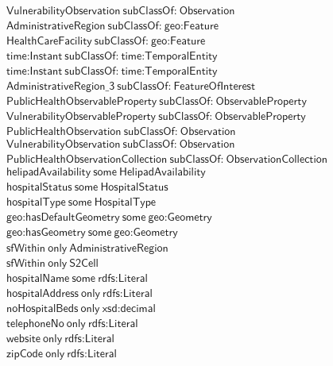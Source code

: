 \begin{align}
  \textsf{VulnerabilityObservation}~\textsf{subClassOf:}~\textsf{Observation}\\
  \textsf{AdministrativeRegion}~\textsf{subClassOf:}~\textsf{geo:Feature}\\
  \textsf{HealthCareFacility}~\textsf{subClassOf:}~\textsf{geo:Feature}\\
  \textsf{time:Instant}~\textsf{subClassOf:}~\textsf{time:TemporalEntity}\\
  \textsf{time:Instant}~\textsf{subClassOf:}~\textsf{time:TemporalEntity}\\
  \textsf{AdministrativeRegion\_3}~\textsf{subClassOf:}~\textsf{FeatureOfInterest}\\
  \textsf{PublicHealthObservableProperty}~\textsf{subClassOf:}~\textsf{ObservableProperty}\\
  \textsf{VulnerabilityObservableProperty}~\textsf{subClassOf:}~\textsf{ObservableProperty}\\
  \textsf{PublicHealthObservation}~\textsf{subClassOf:}~\textsf{Observation}\\
  \textsf{VulnerabilityObservation}~\textsf{subClassOf:}~\textsf{Observation}\\
  \textsf{PublicHealthObservationCollection}~\textsf{subClassOf:}~\textsf{ObservationCollection}\\
  \textsf{helipadAvailability}~\textsf{some}~\textsf{HelipadAvailability}\\
  \textsf{hospitalStatus}~\textsf{some}~\textsf{HospitalStatus}\\
  \textsf{hospitalType}~\textsf{some}~\textsf{HospitalType}\\
  \textsf{geo:hasDefaultGeometry}~\textsf{some}~\textsf{geo:Geometry}\\
  \textsf{geo:hasGeometry}~\textsf{some}~\textsf{geo:Geometry}\\
  \textsf{sfWithin}~\textsf{only}~\textsf{AdministrativeRegion}\\
  \textsf{sfWithin}~\textsf{only}~\textsf{S2Cell}\\
  \textsf{hospitalName}~\textsf{some}~\textsf{rdfs:Literal}\\
  \textsf{hospitalAddress}~\textsf{only}~\textsf{rdfs:Literal}\\
  \textsf{noHospitalBeds}~\textsf{only}~\textsf{xsd:decimal}\\
  \textsf{telephoneNo}~\textsf{only}~\textsf{rdfs:Literal}\\
  \textsf{website}~\textsf{only}~\textsf{rdfs:Literal}\\
  \textsf{zipCode}~\textsf{only}~\textsf{rdfs:Literal}\\

\end{align}
